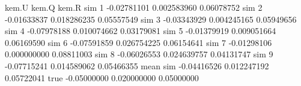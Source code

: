 \begin{Schunk}
\begin{Soutput}
               kem.U       kem.Q      kem.R
sim 1    -0.02781101 0.002583960 0.06078752
sim 2    -0.01633837 0.018286235 0.05557549
sim 3    -0.03343929 0.004245165 0.05949656
sim 4    -0.07978188 0.010074662 0.03179081
sim 5    -0.01379919 0.009051664 0.06169590
sim 6    -0.07591859 0.026754225 0.06154641
sim 7    -0.01298106 0.000000000 0.08811003
sim 8    -0.06026553 0.024639757 0.04131747
sim 9    -0.07715241 0.014589062 0.05466355
mean sim -0.04416526 0.012247192 0.05722041
true     -0.05000000 0.020000000 0.05000000
\end{Soutput}
\end{Schunk}
